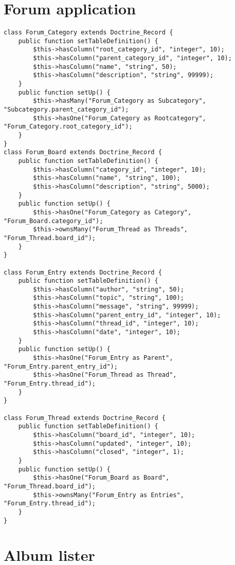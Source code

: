 \documentclass[11pt,a4paper]{report}
\begin{document}
\section{Forum application}
\begin{verbatim}
class Forum_Category extends Doctrine_Record {
    public function setTableDefinition() {
        $this->hasColumn("root_category_id", "integer", 10);
        $this->hasColumn("parent_category_id", "integer", 10);
        $this->hasColumn("name", "string", 50);
        $this->hasColumn("description", "string", 99999);
    }
    public function setUp() {
        $this->hasMany("Forum_Category as Subcategory", "Subcategory.parent_category_id");
        $this->hasOne("Forum_Category as Rootcategory", "Forum_Category.root_category_id");
    }
}
class Forum_Board extends Doctrine_Record {
    public function setTableDefinition() {
        $this->hasColumn("category_id", "integer", 10);
        $this->hasColumn("name", "string", 100);
        $this->hasColumn("description", "string", 5000);
    }
    public function setUp() {
        $this->hasOne("Forum_Category as Category", "Forum_Board.category_id");
        $this->ownsMany("Forum_Thread as Threads",  "Forum_Thread.board_id");
    }
}

class Forum_Entry extends Doctrine_Record {
    public function setTableDefinition() {
        $this->hasColumn("author", "string", 50);
        $this->hasColumn("topic", "string", 100);
        $this->hasColumn("message", "string", 99999);
        $this->hasColumn("parent_entry_id", "integer", 10);
        $this->hasColumn("thread_id", "integer", 10);
        $this->hasColumn("date", "integer", 10);
    }
    public function setUp() {
        $this->hasOne("Forum_Entry as Parent",  "Forum_Entry.parent_entry_id");
        $this->hasOne("Forum_Thread as Thread", "Forum_Entry.thread_id");
    }
}

class Forum_Thread extends Doctrine_Record {
    public function setTableDefinition() {
        $this->hasColumn("board_id", "integer", 10);
        $this->hasColumn("updated", "integer", 10);
        $this->hasColumn("closed", "integer", 1);
    }
    public function setUp() {
        $this->hasOne("Forum_Board as Board", "Forum_Thread.board_id");
        $this->ownsMany("Forum_Entry as Entries", "Forum_Entry.thread_id");
    }
}
\end{verbatim}

\section{Album lister}
\end{document}
